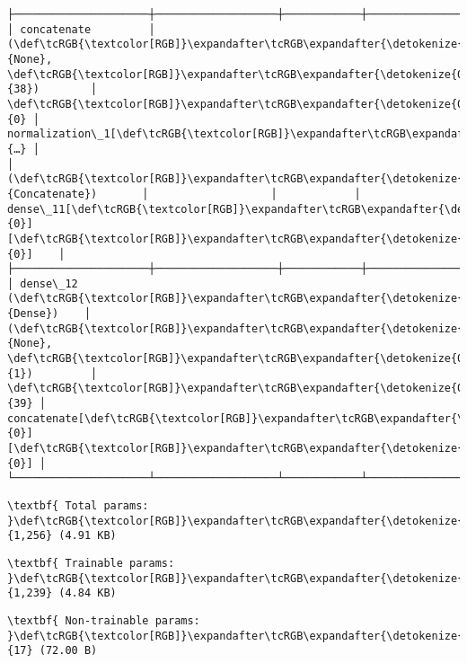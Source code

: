\documentclass[12pt letter]{report}
\begin{document}
\begin{Verbatim}[commandchars=\\\{\}]
├─────────────────────┼───────────────────┼────────────┼───────────────────┤
│ concatenate         │ (\def\tcRGB{\textcolor[RGB]}\expandafter\tcRGB\expandafter{\detokenize{0,215,255}}{None}, \def\tcRGB{\textcolor[RGB]}\expandafter\tcRGB\expandafter{\detokenize{0,175,0}}{38})        │          \def\tcRGB{\textcolor[RGB]}\expandafter\tcRGB\expandafter{\detokenize{0,175,0}}{0} │ normalization\_1[\def\tcRGB{\textcolor[RGB]}\expandafter\tcRGB\expandafter{\detokenize{0,175,0}}{…} │
│ (\def\tcRGB{\textcolor[RGB]}\expandafter\tcRGB\expandafter{\detokenize{0,135,255}}{Concatenate})       │                   │            │ dense\_11[\def\tcRGB{\textcolor[RGB]}\expandafter\tcRGB\expandafter{\detokenize{0,175,0}}{0}][\def\tcRGB{\textcolor[RGB]}\expandafter\tcRGB\expandafter{\detokenize{0,175,0}}{0}]    │
├─────────────────────┼───────────────────┼────────────┼───────────────────┤
│ dense\_12 (\def\tcRGB{\textcolor[RGB]}\expandafter\tcRGB\expandafter{\detokenize{0,135,255}}{Dense})    │ (\def\tcRGB{\textcolor[RGB]}\expandafter\tcRGB\expandafter{\detokenize{0,215,255}}{None}, \def\tcRGB{\textcolor[RGB]}\expandafter\tcRGB\expandafter{\detokenize{0,175,0}}{1})         │         \def\tcRGB{\textcolor[RGB]}\expandafter\tcRGB\expandafter{\detokenize{0,175,0}}{39} │ concatenate[\def\tcRGB{\textcolor[RGB]}\expandafter\tcRGB\expandafter{\detokenize{0,175,0}}{0}][\def\tcRGB{\textcolor[RGB]}\expandafter\tcRGB\expandafter{\detokenize{0,175,0}}{0}] │
└─────────────────────┴───────────────────┴────────────┴───────────────────┘

    \end{Verbatim}

    
    
    \begin{Verbatim}[commandchars=\\\{\}]
\textbf{ Total params: }\def\tcRGB{\textcolor[RGB]}\expandafter\tcRGB\expandafter{\detokenize{0,175,0}}{1,256} (4.91 KB)

    \end{Verbatim}

    
    
    \begin{Verbatim}[commandchars=\\\{\}]
\textbf{ Trainable params: }\def\tcRGB{\textcolor[RGB]}\expandafter\tcRGB\expandafter{\detokenize{0,175,0}}{1,239} (4.84 KB)

    \end{Verbatim}

    
    
    \begin{Verbatim}[commandchars=\\\{\}]
\textbf{ Non-trainable params: }\def\tcRGB{\textcolor[RGB]}\expandafter\tcRGB\expandafter{\detokenize{0,175,0}}{17} (72.00 B)

    \end{Verbatim}
\end{document}
